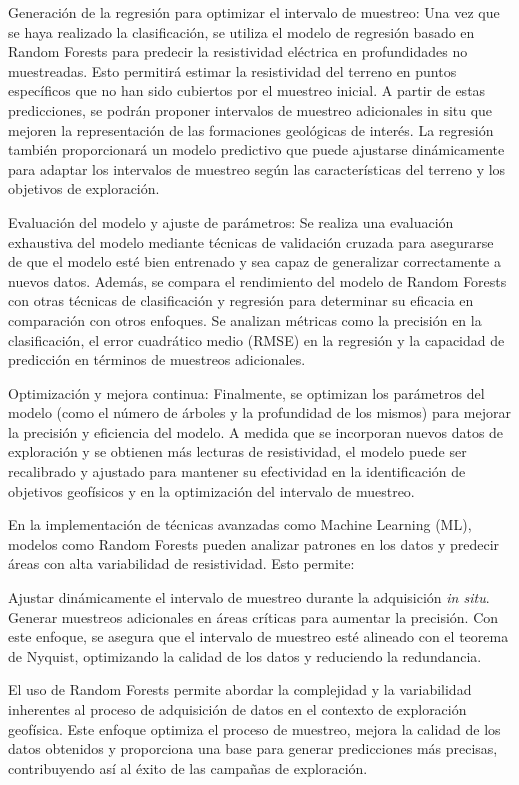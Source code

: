 Generación de la regresión para optimizar el intervalo de muestreo: Una vez que se haya realizado la clasificación, se utiliza el modelo de regresión basado en Random Forests para predecir la resistividad eléctrica en profundidades no muestreadas. Esto permitirá estimar la resistividad del terreno en puntos específicos que no han sido cubiertos por el muestreo inicial. A partir de estas predicciones, se podrán proponer intervalos de muestreo adicionales in situ que mejoren la representación de las formaciones geológicas de interés. La regresión también proporcionará un modelo predictivo que puede ajustarse dinámicamente para adaptar los intervalos de muestreo según las características del terreno y los objetivos de exploración.

Evaluación del modelo y ajuste de parámetros: Se realiza una evaluación exhaustiva del modelo mediante técnicas de validación cruzada para asegurarse de que el modelo esté bien entrenado y sea capaz de generalizar correctamente a nuevos datos. Además, se compara el rendimiento del modelo de Random Forests con otras técnicas de clasificación y regresión para determinar su eficacia en comparación con otros enfoques. Se analizan métricas como la precisión en la clasificación, el error cuadrático medio (RMSE) en la regresión y la capacidad de predicción en términos de muestreos adicionales.

Optimización y mejora continua: Finalmente, se optimizan los parámetros del modelo (como el número de árboles y la profundidad de los mismos) para mejorar la precisión y eficiencia del modelo. A medida que se incorporan nuevos datos de exploración y se obtienen más lecturas de resistividad, el modelo puede ser recalibrado y ajustado para mantener su efectividad en la identificación de objetivos geofísicos y en la optimización del intervalo de muestreo.


En la implementación de técnicas avanzadas como Machine Learning (ML), modelos como Random Forests pueden analizar patrones en los datos y predecir áreas con alta variabilidad de resistividad. Esto permite:

Ajustar dinámicamente el intervalo de muestreo durante la adquisición \textit{in situ}.
Generar muestreos adicionales en áreas críticas para aumentar la precisión.
Con este enfoque, se asegura que el intervalo de muestreo esté alineado con el teorema de Nyquist, optimizando la calidad de los datos y reduciendo la redundancia.

El uso de Random Forests permite abordar la complejidad y la variabilidad inherentes al proceso de adquisición de datos en el contexto de exploración geofísica. Este enfoque optimiza el proceso de muestreo, mejora la calidad de los datos obtenidos y proporciona una base para generar predicciones más precisas, contribuyendo así al éxito de las campañas de exploración.

